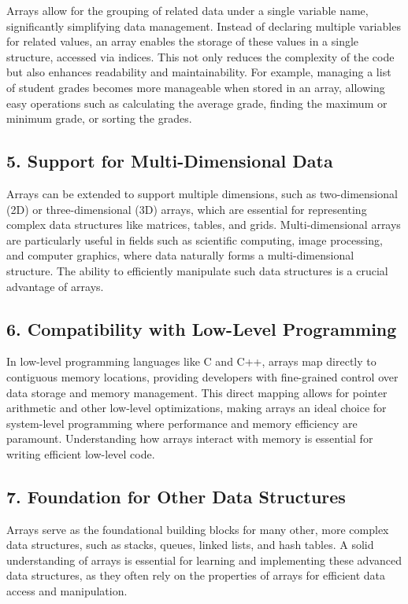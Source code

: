 \documentclass[12pt, oneside]{book}
\begin{document}
Arrays allow for the grouping of related data under a single variable name, significantly simplifying data management. Instead of declaring multiple variables for related values, an array enables the storage of these values in a single structure, accessed via indices. This not only reduces the complexity of the code but also enhances readability and maintainability. For example, managing a list of student grades becomes more manageable when stored in an array, allowing easy operations such as calculating the average grade, finding the maximum or minimum grade, or sorting the grades.

\subsection{5. Support for Multi-Dimensional Data}

Arrays can be extended to support multiple dimensions, such as two-dimensional (2D) or three-dimensional (3D) arrays, which are essential for representing complex data structures like matrices, tables, and grids. Multi-dimensional arrays are particularly useful in fields such as scientific computing, image processing, and computer graphics, where data naturally forms a multi-dimensional structure. The ability to efficiently manipulate such data structures is a crucial advantage of arrays.

\subsection{6. Compatibility with Low-Level Programming}

In low-level programming languages like C and C++, arrays map directly to contiguous memory locations, providing developers with fine-grained control over data storage and memory management. This direct mapping allows for pointer arithmetic and other low-level optimizations, making arrays an ideal choice for system-level programming where performance and memory efficiency are paramount. Understanding how arrays interact with memory is essential for writing efficient low-level code.

\subsection{7. Foundation for Other Data Structures}

Arrays serve as the foundational building blocks for many other, more complex data structures, such as stacks, queues, linked lists, and hash tables. A solid understanding of arrays is essential for learning and implementing these advanced data structures, as they often rely on the properties of arrays for efficient data access and manipulation.
\end{document}
